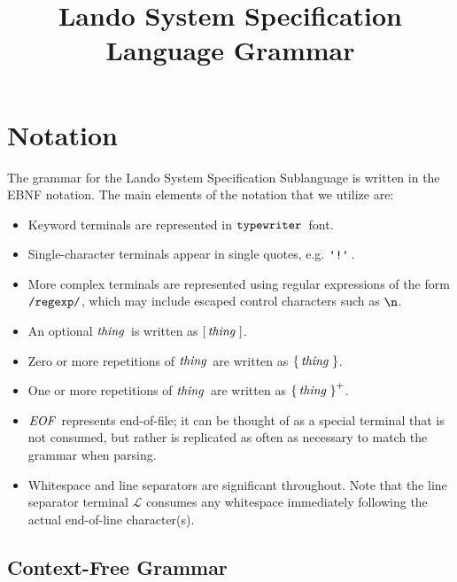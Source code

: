 \documentclass{article}
\newcommand{\gnl}{\ensuremath{\mathcal{L}}}
\begin{document}
\title{Lando System Specification Language Grammar}
\maketitle

\section{Notation}

The grammar for the Lando System Specification Sublanguage is written in the EBNF notation. The main elements of the notation that we utilize are:
\begin{itemize}
  \item Keyword terminals are represented in $\mathop{\texttt{typewriter}}\,$ font. 
  \item Single-character terminals appear in single quotes, e.g. $\gtkc{!}$.
  \item More complex terminals are represented using regular expressions of the form $\texttt{/{regexp}/}$, which may include escaped control characters such as $\texttt{\textbackslash {n}}$.
  \item An optional $\mathop{\textit{thing}}\,$ is written as $\mathop{\operatorname{[} \mathop{\mathop{\textit{thing}}\,} \operatorname{]}}$.
  \item {Zero or more repetitions of $\mathop{\textit{thing}}\,$ are written as $\mathop{\operatorname{\{} \mathop{\textit{thing}}\, \operatorname{\}}}$}.
  \item One or more repetitions of $\mathop{\textit{thing}}\,$ are written as $\mathop{\operatorname{\{} \mathop{\textit{thing}}\, \operatorname{\}}^+}$.
  \item $\mathop{\textit{EOF}}\,$ represents end-of-file; it can be thought of as a special terminal that is not consumed, but rather is replicated as often as necessary to match the grammar when parsing.
  \item Whitespace and line separators are significant throughout. Note that the line separator terminal $\gnl$ consumes any whitespace immediately following the actual end-of-line character(s).
\end{itemize}

\subsection{Context-Free Grammar}
\end{document}
